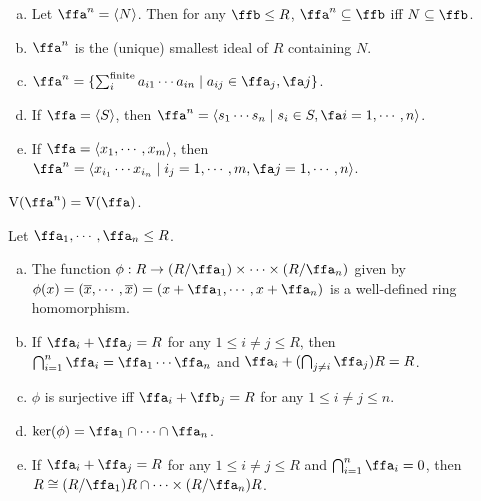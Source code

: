 \begin{proposition}
    \begin{enumerate}[(a)]
        \item
            Let $\ffa^n = \langle N \rangle$. Then for any $\ffb \leq R$, $\ffa^n \subseteq \ffb$ iff $N \subseteq \ffb$.
        \item 
            $\ffa^n$ is the (unique) smallest ideal of $R$ containing $N$.
        \item $\ffa^n = \{\sum_{i}^{\text{finite}}a_{i1} \cdots a_{in} \mid a_{ij} \in \ffa_j,\fa j\}$.
        \item If $\ffa = \langle S \rangle$, then $\ffa^n = \langle s_1 \cdots s_n \mid s_i \in S,\fa i = 1,\cdots,n\rangle$.
        \item 
            If $\ffa = \langle x_1,\cdots,x_m \rangle$, then $\ffa^n = \langle x_{i_1} \cdots x_{i_n} \mid i_j = 1,\cdots,m,\fa j = 1,\cdots,n \rangle$.
    \end{enumerate}
\end{proposition}

\begin{remark}[Fact]
    $\operatorname{V}(\ffa^n) = \operatorname{V}(\ffa)$.
\end{remark}

\begin{proposition}
    Let $\ffa_1,\cdots,\ffa_n \leq R$.
    \begin{enumerate}[(a)]
        \item The function $\phi: R \to (R/\ffa_1) \times \cdots \times (R/\ffa_n)$ given by $\phi(x) = (\overline x, \cdots, \overline x) = (x+\ffa_1,\cdots,x+\ffa_n)$ is a well-defined ring homomorphism.
        \item If $\ffa_i + \ffa_j = R$ for any $1 \leq i \neq j \leq R$, then $\bigcap_{i=1}^n \ffa_i = \ffa_1 \cdots \ffa_n$ and $\ffa_i + (\bigcap_{j \neq i} \ffa_j)R = R$.
        \item $\phi$ is surjective iff $\ffa_i + \ffb_j = R$ for any $1 \leq i \neq j \leq n$.
        \item $\ker(\phi) = \ffa_1 \cap \cdots \cap \ffa_n$.
        \item If $\ffa_i + \ffa_j = R$ for any $1 \leq i \neq j \leq R$ and $\bigcap_{i=1}^n \ffa_i = 0$, then $R \cong (R/\ffa_1)R \cap \cdots \times (R/\ffa_n)R$.
    \end{enumerate}
\end{proposition}

